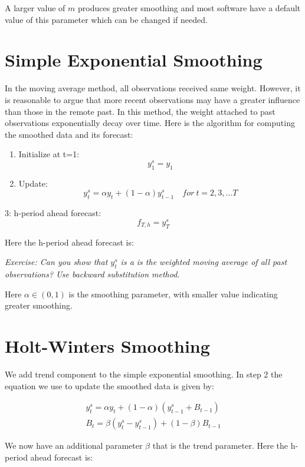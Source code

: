 \documentclass[]{book}
\theoremstyle{definition}
\theoremstyle{definition}
\theoremstyle{definition}
\theoremstyle{remark}
\begin{document}
A larger value of \(m\) produces greater smoothing and most software have a default value of this parameter which can be changed if needed.

\hypertarget{simple-exponential-smoothing}{%
\section{Simple Exponential Smoothing}\label{simple-exponential-smoothing}}

In the moving average method, all observations received same weight. However, it is reasonable to argue that more recent observations may have a greater influence than those in the remote past. In this method, the weight attached to past observations exponentially decay over time. Here is the algorithm for computing the smoothed data and its forecast:

\begin{enumerate}
\def\labelenumi{\arabic{enumi}.}
\item
  Initialize at t=1:
  \[y_1^s=y_1\]
\item
  Update:
  \[y_{t}^{s}= \alpha y_t + (1-\alpha)y_{t-1}^{s}  \quad for \ t=2,3,...T\]
\end{enumerate}

3: h-period ahead forecast:
\[f_{T,h}= y_T^s\]

Here the h-period ahead forecast is:

\emph{Exercise: Can you show that \(y_{t}^{s}\) is a is the weighted moving average of all past observations? Use backward substitution method.}

Here \(\alpha \in (0,1)\) is the smoothing parameter, with smaller value indicating greater smoothing.

\hypertarget{holt-winters-smoothing}{%
\section{Holt-Winters Smoothing}\label{holt-winters-smoothing}}

We add trend component to the simple exponential smoothing. In step 2 the equation we use to update the smoothed data is given by:

\begin{align}
    y_{t}^{s}= \alpha y_t + (1-\alpha)(y_{t-1}^{s}+B_{t-1}) \\ \nonumber
    B_t = \beta (y_t^s -y_{t-1}^s) + (1-\beta) B_{t-1}
 \end{align}

We now have an additional parameter \(\beta\) that is the trend parameter. Here the h-period ahead forecast is:
\end{document}
